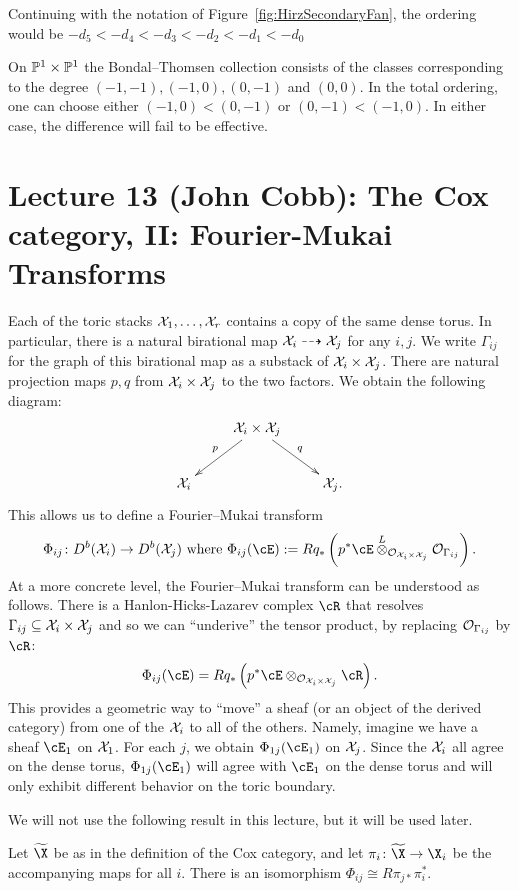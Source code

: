 \documentclass{amsart}
\begin{document}
\begin{example}
Continuing with the notation of Figure~\ref{fig:HirzSecondaryFan}, the ordering would be $-d_5<-d_4<-d_3<-d_2<-d_1<-d_0$
\end{example}
\begin{example}
    On $\mathbb P^1\times \mathbb P^1$ the Bondal--Thomsen collection consists of the classes corresponding to the degree $(-1,-1), (-1,0), (0,-1)$ and $(0,0)$.  In the total ordering, one can choose either $(-1,0)<(0,-1)$ or $(0,-1)<(-1,0)$.  In either case, the difference will fail to be effective.
\end{example}


\section{Lecture 13 (John Cobb): The Cox category, II: Fourier-Mukai Transforms}\label{lec:13-DCox-FM-transform}
\label{sec:FMTransform}
Each of the toric stacks $\mathcal X_1, \dots, \mathcal X_r$ contains a copy of the same dense torus.  In particular, there is a natural birational map $\mathcal X_i\dashrightarrow \mathcal X_j$ for any $i,j$.  We write $\Gamma_{ij}$ for the graph of this birational map as a substack of $\mathcal X_i\times \mathcal X_j$.  There are natural projection maps $p,q$ from $\mathcal X_i\times \mathcal X_j$ to the two factors. We obtain the following diagram:
\[
\xymatrix{
&\sX_i\times \sX_j\ar[ld]_{p}\ar[rd]^{q}&\\
\sX_i&&\sX_j.
}
\]
This allows us to define a Fourier--Mukai transform
\[
\Phi_{ij}\colon D^b(\sX_i)\to D^b(\sX_j) \text{ where } \Phi_{ij}(\cE) := Rq_*\left(p^*\cE \Lotimes_{\cO_{\sX_i\times \sX_j}} \cO_{\Gamma_{ij}}\right).
\]
At a more concrete level, the Fourier--Mukai transform can be understood as follows.  There is a Hanlon-Hicks-Lazarev complex $\cR$ that resolves $\Gamma_{ij}\subseteq \mathcal X_i\times \mathcal X_j$ and so we can ``underive'' the tensor product, by replacing ${\mathcal O}_{\Gamma_{ij}}$ by $\cR$:
\[
\Phi_{ij}(\cE) = Rq_*\left(p^*\cE \otimes_{\cO_{\sX_i\times \sX_j}} \cR\right).
\]
This provides a geometric way to ``move'' a sheaf (or an object of the derived category) from one of the $\mathcal X_i$ to all of the others.  Namely, imagine we have a sheaf $\cE_1$ on $\mathcal X_1$.  For each $j$, we obtain $\Phi_{1j}(\cE_1)$ on $\mathcal X_j$.  Since the $\mathcal X_i$ all agree on the dense torus, $\Phi_{1j}(\cE_1)$ will agree with $\cE_1$ on the dense torus and will only exhibit different behavior on the toric boundary.

We will not use the following result in this lecture, but it will be used later. 
\begin{prop}
\label{prop:pullpush}
Let $\widetilde{\X}$ be as in the definition of the Cox category, and let $\pi_i \co \widetilde{\X} \to \X_i$ be the accompanying maps for all $i$. There is an isomorphism $\Phi_{ij} \cong R\pi_{j *}\pi_i^*$.
\end{prop}
\end{document}
